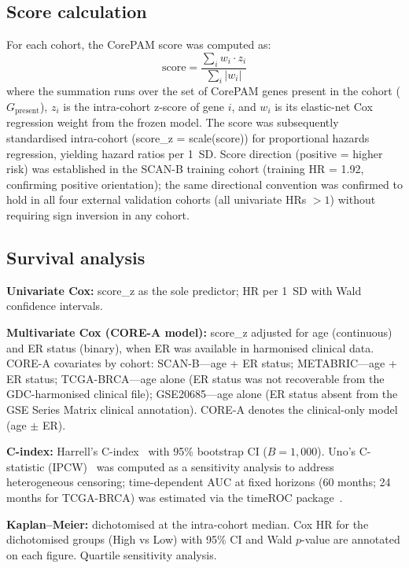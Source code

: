 \documentclass[referee,lineno,pdflatex,sn-vancouver-num]{sn-jnl}
\begin{document}
\subsection{Score calculation}\label{subsec:score-calculation}

For each cohort, the CorePAM score was computed as:
\begin{equation}
\text{score} = \frac{\sum_{i} w_i \cdot z_i}{\sum_{i} |w_i|}
\end{equation}
where the summation runs over the set of CorePAM genes present in the cohort ($G_{\text{present}}$), $z_i$ is the intra-cohort z-score of gene $i$, and $w_i$ is its elastic-net Cox regression weight from the frozen model. The score was subsequently standardised intra-cohort (score\_z = scale(score)) for proportional hazards regression, yielding hazard ratios per 1~SD. Score direction (positive = higher risk) was established in the SCAN-B training cohort (training HR = 1.92, confirming positive orientation); the same directional convention was confirmed to hold in all four external validation cohorts (all univariate HRs $> 1$) without requiring sign inversion in any cohort.

\subsection{Survival analysis}\label{subsec:survival-analysis}

\textbf{Univariate Cox:} score\_z as the sole predictor; HR per 1~SD with Wald confidence intervals.

\textbf{Multivariate Cox (CORE-A model):} score\_z adjusted for age (continuous) and ER status (binary), when ER was available in harmonised clinical data. CORE-A covariates by cohort: SCAN-B---age + ER status; METABRIC---age + ER status; TCGA-BRCA---age alone (ER status was not recoverable from the GDC-harmonised clinical file); GSE20685---age alone (ER status absent from the GSE Series Matrix clinical annotation). CORE-A denotes the clinical-only model (age $\pm$ ER).

\textbf{C-index:} Harrell's C-index~\cite{harrell1982} with 95\% bootstrap CI ($B = 1{,}000$). Uno's C-statistic (IPCW)~\cite{uno2011} was computed as a sensitivity analysis to address heterogeneous censoring; time-dependent AUC at fixed horizons (60 months; 24 months for TCGA-BRCA) was estimated via the timeROC package~\cite{blanche2013}.

\textbf{Kaplan--Meier:} dichotomised at the intra-cohort median. Cox HR for the dichotomised groups (High vs Low) with 95\% CI and Wald $p$-value are annotated on each figure. Quartile sensitivity analysis.
\end{document}
